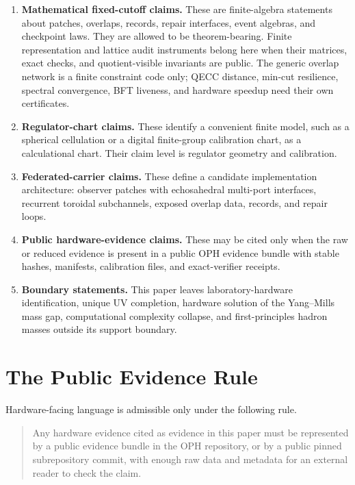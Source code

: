 \documentclass[11pt]{article}
\theoremstyle{remark}
\theoremstyle{plain}
\begin{document}
\begin{enumerate}[leftmargin=2em,label=\textbf{C\arabic*.}]
\item \textbf{Mathematical fixed-cutoff claims.} These are finite-algebra statements about
patches, overlaps, records, repair interfaces, event algebras, and checkpoint laws. They are
allowed to be theorem-bearing. Finite representation and lattice audit instruments belong here
when their matrices, exact checks, and quotient-visible invariants are public. The generic overlap
network is a finite constraint code only;
QECC distance, min-cut resilience, spectral convergence, BFT liveness, and hardware speedup need
their own certificates.

\item \textbf{Regulator-chart claims.} These identify a convenient finite model, such as a
spherical cellulation or a digital finite-group calibration chart, as a calculational chart. Their claim
level is regulator geometry and calibration.

\item \textbf{Federated-carrier claims.} These define a candidate implementation architecture:
observer patches with echosahedral multi-port interfaces, recurrent toroidal subchannels, exposed
overlap data, records, and repair loops.

\item \textbf{Public hardware-evidence claims.} These may be cited only when the raw or reduced
evidence is present in a public OPH evidence bundle with stable hashes, manifests, calibration
files, and exact-verifier receipts.

\item \textbf{Boundary statements.} This paper leaves laboratory-hardware identification, unique
UV completion, hardware solution of the Yang--Mills mass gap, computational complexity collapse,
and first-principles hadron masses outside its support boundary.
\end{enumerate}

\section{The Public Evidence Rule}

Hardware-facing language is admissible only under the following rule.

\begin{quote}
Any hardware evidence cited as evidence in this paper must be represented by a public evidence
bundle in the OPH repository, or by a public pinned subrepository commit, with enough raw data and
metadata for an external reader to check the claim.
\end{quote}
\end{document}
